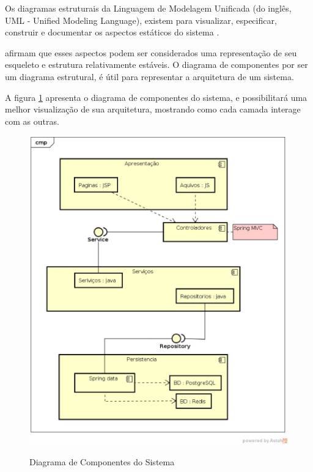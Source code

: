 \documentclass[a4paper,12pt]{monografia}
\begin{document}
Os diagramas estruturais da Linguagem de Modelagem Unificada (do inglês, UML - Unified Modeling Language), existem para visualizar, especificar, construir e documentar os aspectos estáticos do sistema \cite{booch2006uml}. 

 afirmam que esses aspectos podem ser considerados uma representação de seu esqueleto e estrutura relativamente estáveis. O diagrama de componentes por ser um diagrama estrutural, é útil para representar a arquitetura de um sistema.

A figura \ref{fig:cd} apresenta o diagrama de componentes do sistema, e possibilitará uma melhor visualização de sua arquitetura, mostrando como cada camada interage com as outras.

\begin{figure}[H]
\centering
\caption{Diagrama de Componentes do Sistema}
\centering
\includegraphics[width=15cm]{img/diagramas/cd.eps}\\
\label{fig:cd}
\end{figure}

\end{document}
